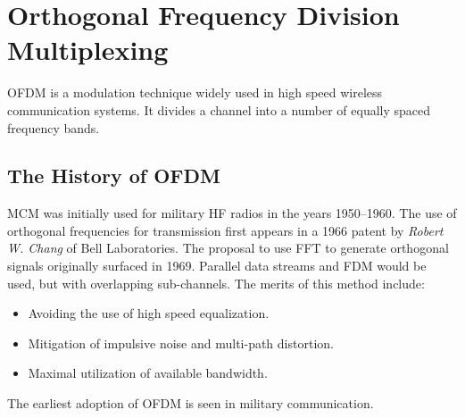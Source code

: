 \section{Orthogonal Frequency Division Multiplexing}

\gls{OFDM} is a modulation technique widely used in high speed wireless communication systems. It divides a channel into a number of equally spaced frequency bands.

\subsection{The History of OFDM}
\gls{MCM} was initially used for military \gls{HF} radios in the years 1950--1960. The use of orthogonal frequencies for transmission first appears in a 1966 patent by \emph{Robert W. Chang} of Bell Laboratories\cite{ofdm_intro}.
The proposal to use \gls{FFT} to generate orthogonal signals originally surfaced in 1969. Parallel data streams and \gls{FDM} would be used, but with overlapping sub-channels. The merits of this method include:
\begin{itemize}
	\item Avoiding the use of high speed equalization.
	\item Mitigation of impulsive noise and multi-path distortion.
	\item Maximal utilization of available bandwidth.
\end{itemize}
The earliest adoption of OFDM is seen in military communication.
